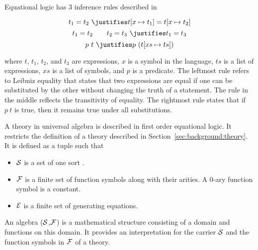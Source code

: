 Equational logic has $3$ inference rules described in~\cite{Gries1993EquationalLogic}  
\begin{proofrules}
        \[ t_1 = t_2 \ \justifies t[x \mapsto t_1] = t[x \mapsto t_2] \]
        \[ t_1 = t_2 \qquad t_2 = t_3 \ \justifies t_1 = t_3 \]
        \[p\ t \ \justifies p\ (t[xs \mapsto ts]) \] 
\end{proofrules}       
\noindent where $t$, $t_1$, $t_2$, and $t_3$ are expressions, $x$ is a symbol in the language, $ts$ is a list of expressions, $xs$ is a list of symbols, and $p$ is a predicate. 
The leftmost rule refers to Leibniz equality that states that two expressions are equal if one can be substituted by the other without changing the truth of a statement. 
The rule in the middle reflects the transitivity of equality. 
The rightmost rule states that if $p\ t$ is true, then it remains true under all substitutions.  

A theory in universal algebra is described in first order equational logic. It restricts the definition of a theory described in Section~\ref{sec:background:theory}. It is defined as a tuple \lstmath{($\sort$,$\fsyms$,$\equations$)}
such that 
\begin{itemize}
\item $\sort$ is a set of one sort . 
\item $\fsyms$ is a finite set of function symbols along with their arities. A $0$-ary function symbol is a constant. 
\item $\equations$ is a finite set of generating equations. 
\end{itemize}

An algebra ($\sort$,$\fsyms$) is a mathematical structure consisting of a domain and functions on this domain. It provides an interpretation for the carrier $\sort$ and the function symbols in $\fsyms$ of a theory.  

